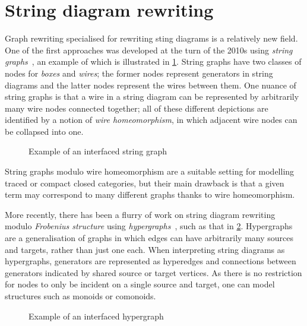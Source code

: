 \section{String diagram rewriting}

Graph rewriting specialised for rewriting sting diagrams is a
relatively new field.
One of the first approaches was developed at the turn of the 2010s using
\emph{string graphs}~\cite{%
    dixon2010open,dixon2013opengraphs,kissinger2012pictures%
}, an example of which is illustrated in \cref{fig:string-graph}.
String graphs have two classes of nodes for \emph{boxes} and \emph{wires}; the
former nodes represent generators in string diagrams and the latter nodes
represent the wires between them.
One nuance of string graphs is that a wire in a string diagram can be
represented by arbitrarily many wire nodes connected together; all of these
different depictions are identified by a notion of \emph{wire homeomorphism}, in
which adjacent wire nodes can be collapsed into one.

\begin{figure}
    \centering
    \caption{Example of an interfaced string graph}
    \label{fig:string-graph}
\end{figure}

String graphs modulo wire homeomorphism are a suitable setting for modelling
traced or compact closed categories, but their main drawback is that a given
term may correspond to many different graphs thanks to wire homeomorphism.

More recently, there has been a flurry of work on string
diagram rewriting modulo \emph{Frobenius structure} using
\emph{hypergraphs}~\cite{%
    bonchi2016rewriting,zanasi2017rewriting,bonchi2017confluence,%
    bonchi2018rewriting,bonchi2022string,bonchi2022stringa,bonchi2022stringb%
}, such as that in \cref{fig:hypergraph-intro}.
Hypergraphs are a generalisation of graphs in which edges can have arbitrarily
many sources and targets, rather than just one each.
When interpreting string diagrams as hypergraphs, generators are represented as
hyperedges and connections between generators indicated by shared source or
target vertices.
As there is no restriction for nodes to only be incident on a single source and
target, one can model structures such as monoids or comonoids.

\begin{figure}
    \centering
    \caption{Example of an interfaced hypergraph}
    \label{fig:hypergraph-intro}
\end{figure}

